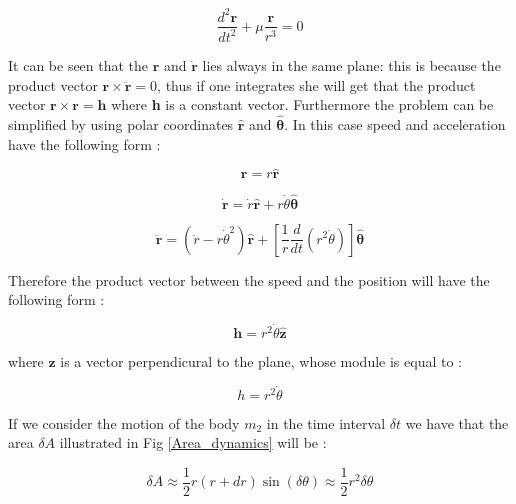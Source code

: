 \documentclass[12pt,%
               a4paper,%
               oneside,openany,%
               titlepage,%
               headinclude,footinclude,%
               BCOR5mm,%
               cleardoublepage=empty,%
               tablecaptionabove,%
               floatperchapter,
               ]{scrreprt}                 %
\begin{document}
\begin{equation}
\dfrac{d^{2}\textbf{r}}{dt^{2}}+\mu\dfrac{\textbf{r}}{r^{3}}=0
\end{equation}


It can be seen that the $\textbf{r}$ and $\dot{\textbf{r}}$ lies always in the same plane: this is because the product vector $\textbf{r} \times \ddot{ \textbf{r}}=0$, thus if one integrates she will get that the product vector $\textbf{r} \times \textbf{r}=\textbf{h}$ where \textbf{h} is a constant vector. Furthermore the problem can be simplified by using polar coordinates  $\hat{\textbf{r}}$ and $\hat{\boldsymbol{\theta}}$. In this case speed and acceleration have the following form \cite{murray1999solar}:

\begin{equation}
\textbf{r}=r\hat{\textbf{r}}
\end{equation}

\begin{equation}
\dot{\textbf{r}}=\dot{r}\hat{\textbf{r}}+r\dot{\theta}\hat{\boldsymbol{\theta}}
\label{eq_dyn_nop}
\end{equation}

\begin{equation}
\ddot{\textbf{r}}=\left(\ddot{r}-r\dot{\theta}^{2}\right)\hat{\textbf{r}}+\left[\dfrac{1}{r}\frac{d}{dt}\left(r^{2}\dot{\theta}\right)\right]\hat{\boldsymbol{\theta}}
\end{equation}

Therefore the product vector between the speed and the position will have the following form \cite{murray1999solar}:

\begin{equation}
\textbf{h}=r^{2}\dot{\theta}\hat{\textbf{z}}
\end{equation}

where $\textbf{z}$ is a vector perpendicural to the plane, whose module is equal to \cite{murray1999solar}:

\begin{equation}
h=r^{2}\dot{\theta}
\end{equation}

If we consider the motion of the body $m_{2}$ in the time interval $\delta t$ we have that the area $\delta A$ illustrated in Fig \ref{Area_dynamics} will be \cite{murray1999solar}:

\begin{equation}
\delta A \approx \dfrac{1}{2} r(r+dr)\sin(\delta\theta) \approx  \dfrac{1}{2} r^{2}\delta\theta
\end{equation}
\end{document}
